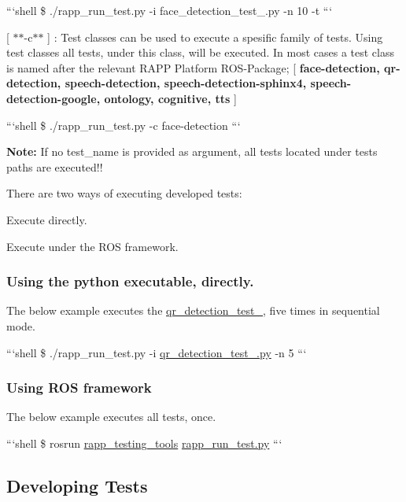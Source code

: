 ```shell \$ ./rapp\-\_\-run\-\_\-test.py -\/i face\-\_\-detection\-\_\-test\-\_.\-py -\/n 10 -\/t ```


\begin{DoxyItemize}
\item \mbox{[} $\ast$$\ast$-\/c$\ast$$\ast$ \mbox{]} \-: Test classes can be used to execute a spesific family of tests. Using test classes all tests, under this class, will be executed. In most cases a test class is named after the relevant R\-A\-P\-P Platform R\-O\-S-\/\-Package; \mbox{[} {\bfseries face-\/detection, qr-\/detection, speech-\/detection, speech-\/detection-\/sphinx4, speech-\/detection-\/google, ontology, cognitive, tts} \mbox{]}
\end{DoxyItemize}

```shell \$ ./rapp\-\_\-run\-\_\-test.py -\/c face-\/detection ```

{\bfseries Note\-:} If no test\-\_\-name is provided as argument, all tests located under tests paths are executed!!

There are two ways of executing developed tests\-:
\begin{DoxyItemize}
\item Execute directly.
\item Execute under the R\-O\-S framework.
\end{DoxyItemize}

\subsubsection*{Using the python executable, directly.}

The below example executes the \hyperlink{namespaceqr__detection__test__1}{qr\-\_\-detection\-\_\-test\-\_}, five times in sequential mode.

```shell \$ ./rapp\-\_\-run\-\_\-test.py -\/i \hyperlink{qr__detection__test__1_8py}{qr\-\_\-detection\-\_\-test\-\_.\-py} -\/n 5 ```

\subsubsection*{Using R\-O\-S framework}

The below example executes all tests, once.

```shell \$ rosrun \hyperlink{namespacerapp__testing__tools}{rapp\-\_\-testing\-\_\-tools} \hyperlink{rapp__run__test_8py}{rapp\-\_\-run\-\_\-test.\-py} ```

\subsection*{Developing Tests}

